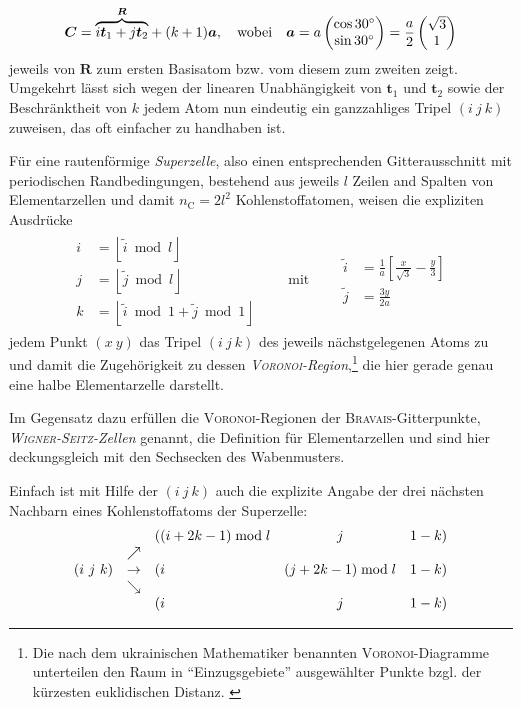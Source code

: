 \documentclass[a4paper, 10pt, twoside, openany]{book} %
\newcommand \bracks[1]{\left [ #1 \right ]}
\newcommand \floor[1]{\left \lfloor #1 \right \rfloor}
\def \mod {\bmod}
\def \vec {\boldsymbol}
\newcommand \mat[1]{\begin{pmatrix} #1 \end{pmatrix}}
\def \nC {n_\mathrm{C}}
\begin{document}
	\begin{align*}
		\vec C = \smash{\overbrace{i \vec t_1 + j \vec t_2}^{\vec R}} + (k + 1) \vec a, \quad \text{wobei} \quad \vec a = a \mat{\cos 30^\circ \\ \sin 30^\circ} = \frac a 2 \mat{\sqrt 3 \\ 1}
	\end{align*}
	jeweils von $\vec R$ zum ersten Basisatom bzw. vom diesem zum zweiten zeigt. Umgekehrt lässt sich wegen der linearen Unabhängigkeit von $\vec t_1$ und $\vec t_2$ sowie der Beschränktheit von $k$ jedem Atom nun eindeutig ein ganzzahliges Tripel $(i \ j \ k)$ zuweisen, das oft einfacher zu handhaben ist.
	
	Für eine rautenförmige \emph{Superzelle}, also einen entsprechenden Gitterausschnitt mit periodischen Randbedingungen, bestehend aus jeweils $l$ Zeilen and Spalten von Elementarzellen und damit $\nC = 2 l^2$ Kohlenstoffatomen, weisen die expliziten Ausdrücke
	\begin{align}
		\begin{aligned}
			i &= \floor{\tilde i \mod l} \\
			j &= \floor{\tilde j \mod l} \\
			k &= \floor{\tilde i \mod 1 + \tilde j \mod 1}
		\end{aligned}
		\qquad \text{mit} \qquad
		\begin{aligned}
			\tilde i &= \frac 1 a \bracks{\frac x {\sqrt 3} - \frac y 3} \\
			\tilde j &= \frac{3 y}{2 a}
		\end{aligned}
		\label{ijk}
	\end{align}
	jedem Punkt $(x \ y)$ das Tripel $(i \ j \ k)$ des jeweils nächstgelegenen Atoms zu und damit die Zugehörigkeit zu dessen \emph{\textsc{Voronoi}-Region},\footnote{Die nach dem ukrainischen Mathematiker benannten \textsc{Voronoi}-Diagramme unterteilen den Raum in "`Einzugsgebiete"' ausgewählter Punkte bzgl. der kürzesten euklidischen Distanz. \cite[S.~10]{Edelsbrunner}} die hier gerade genau eine halbe Elementarzelle darstellt.
	
	Im Gegensatz dazu erfüllen die \textsc{Voronoi}-Regionen der \textsc{Bravais}-Gitterpunkte, \emph{\textsc{Wigner-Seitz}-Zellen} genannt, die Definition für Elementarzellen und sind hier deckungsgleich mit den Sechsecken des Wabenmusters.
	
	Einfach ist mit Hilfe der $(i \ j \ k)$ auch die explizite Angabe der drei nächsten Nachbarn eines Kohlenstoffatoms der Superzelle:
	\begin{align*}
	    \begin{array}{r c l c r}
			& & ((i + 2 k - 1) \mod l & j & 1 - k) \\
			& \nearrow & & & \\
			(i \ j \ k) & \rightarrow & (i & (j + 2 k - 1) \mod l & 1 - k) \\
			& \searrow & & & \\
			& & (i & j & 1 - k)
		\end{array}
	\end{align*}
	
\end{document}
